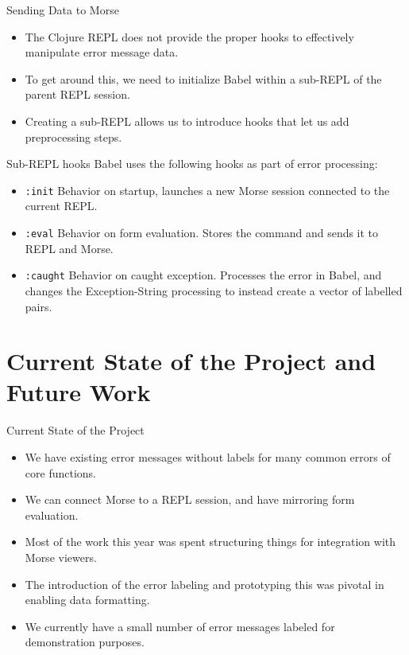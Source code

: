 \documentclass{beamer}
\begin{document}
\begin{frame}{Sending Data to Morse}
  \begin{itemize}
    \item<1-> The Clojure REPL does not provide the proper hooks to effectively manipulate error message data.
    \item<2-> To get around this, we need to initialize Babel within a sub-REPL of the parent REPL session.
    \item<3-> Creating a sub-REPL allows us to introduce hooks that let us add preprocessing steps.
  \end{itemize}
\end{frame}

\begin{frame}{Sub-REPL hooks}
  Babel uses the following hooks as part of error processing:
  \begin{itemize}
    \item<1-> \texttt{:init} Behavior on startup, launches a new Morse session connected to the current REPL.
    \item<2-> \texttt{:eval} Behavior on form evaluation. Stores the command and sends it to REPL and Morse.
    \item<3-> \texttt{:caught} Behavior on caught exception. Processes the error in Babel, and changes the Exception-\>String processing to instead create a vector of labelled pairs.  
  \end{itemize}
\end{frame}

\section{Current State of the Project and Future Work}
\begin{frame}{Current State of the Project}
  \begin{itemize}
    \item<1-> We have existing error messages without labels for many common errors of core functions.
    \item<2-> We can connect Morse to a REPL session, and have mirroring form evaluation.
    \item<3-> Most of the work this year was spent structuring things for integration with Morse viewers.
    \item<4-> The introduction of the error labeling and prototyping this was pivotal in enabling data formatting.
    \item<5-> We currently have a small number of error messages labeled for demonstration purposes.
  \end{itemize}
\end{frame}
\end{document}
